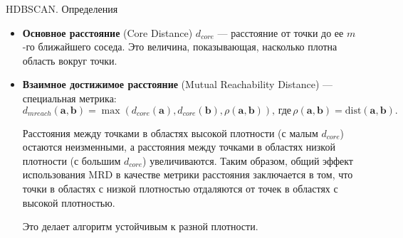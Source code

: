 \documentclass[unicode, notheorems, handout]{beamer}
\begin{document}
\begin{frame}{HDBSCAN. Определения}
\small 
\begin{itemize}
    \item \textbf{Основное расстояние} (Core Distance) $d_{core}$ --- расстояние от точки до ее $m$-го ближайшего соседа. Это величина, показывающая, насколько плотна область вокруг точки.
\vspace{1ex}

    \item \textbf{Взаимное достижимое расстояние} (Mutual Reachability Distance) --- специальная метрика:
$$d_{mreach}(\pmb{a}, \pmb{b}) = \max (d_{core}(\pmb a), d_{core} (\pmb b), \rho(\pmb a, \pmb b)),\, \text{где}\, \rho(\pmb a, \pmb b) = \text{dist}(\pmb a, \pmb b). $$
\vspace{-2ex}

 Расстояния между точками в областях высокой плотности (с малым $d_{core}$) остаются неизменными, а расстояния между точками в областях низкой плотности (с большим $d_{core}$) увеличиваются. Таким образом, общий эффект использования MRD в качестве метрики расстояния заключается в том, что точки в областях с низкой плотностью отдаляются от точек в областях с высокой плотностью.
\vspace{0.5ex}

Это делает алгоритм устойчивым к разной плотности.
\end{itemize}
\end{frame}
\end{document}
